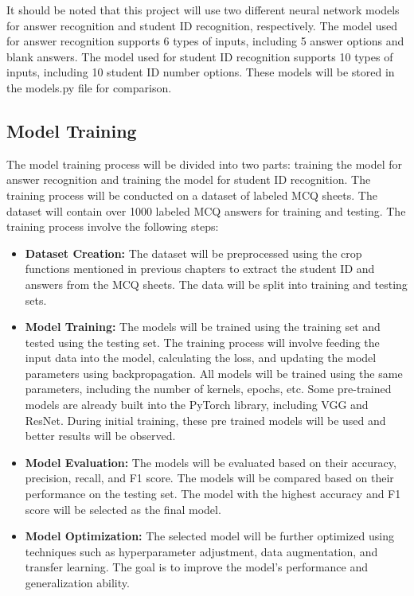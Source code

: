 \documentclass[twocolumn]{article}
\begin{document}
    It should be noted that this project will use two different neural network models for answer recognition and student ID recognition, respectively. The model used for answer recognition supports 6 types of inputs, including 5 answer options and blank answers. The model used for student ID recognition supports 10 types of inputs, including 10 student ID number options. These models will be stored in the models.py file for comparison.
    \subsection{Model Training}
    The model training process will be divided into two parts: training the model for answer recognition and training the model for student ID recognition. The training process will be conducted on a dataset of labeled MCQ sheets. The dataset will contain over 1000 labeled MCQ answers for training and testing. The training process involve the following steps:
    \begin{itemize}
        \item \textbf{Dataset Creation:} The dataset will be preprocessed using the crop functions mentioned in previous chapters to extract the student ID and answers from the MCQ sheets. The data will be split into training and testing sets.
        \item \textbf{Model Training:} The models will be trained using the training set and tested using the testing set. The training process will involve feeding the input data into the model, calculating the loss, and updating the model parameters using backpropagation. All models will be trained using the same parameters, including the number of kernels, epochs, etc. Some pre-trained models are already built into the PyTorch library, including VGG and ResNet. During initial training, these pre trained models will be used and better results will be observed.
        \item \textbf{Model Evaluation:} The models will be evaluated based on their accuracy, precision, recall, and F1 score. The models will be compared based on their performance on the testing set. The model with the highest accuracy and F1 score will be selected as the final model.
        \item \textbf{Model Optimization:} The selected model will be further optimized using techniques such as hyperparameter adjustment, data augmentation, and transfer learning. The goal is to improve the model's performance and generalization ability.
    \end{itemize}
\end{document}
